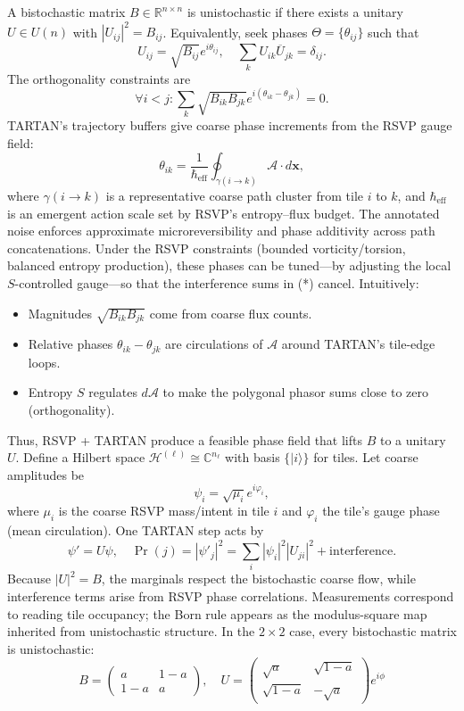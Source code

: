 \documentclass[11pt]{article}
\theoremstyle{plain}
\theoremstyle{definition}
\begin{document}
A bistochastic matrix $B \in \mathbb{R}^{n \times n}$ is unistochastic if there exists a unitary $U \in U(n)$ with $|U_{ij}|^2 = B_{ij}$. Equivalently, seek phases $\Theta = \{\theta_{ij}\}$ such that
\[
U_{ij} = \sqrt{B_{ij}} e^{i \theta_{ij}}, \quad \sum_k U_{ik} \overline{U}_{jk} = \delta_{ij}.
\]
The orthogonality constraints are
\[
\forall i < j: \sum_k \sqrt{B_{ik} B_{jk}} e^{i (\theta_{ik} - \theta_{jk})} = 0. \tag{*}
\]
TARTAN’s trajectory buffers give coarse phase increments from the RSVP gauge field:
\[
\theta_{ik} = \frac{1}{\hbar_{\mathrm{eff}}} \oint_{\gamma(i \to k)} \mathcal{A} \cdot d\bm{x},
\]
where $\gamma(i \to k)$ is a representative coarse path cluster from tile $i$ to $k$, and $\hbar_{\mathrm{eff}}$ is an emergent action scale set by RSVP’s entropy–flux budget. The annotated noise enforces approximate microreversibility and phase additivity across path concatenations. Under the RSVP constraints (bounded vorticity/torsion, balanced entropy production), these phases can be tuned—by adjusting the local $S$-controlled gauge—so that the interference sums in (*) cancel. Intuitively:
\begin{itemize}
    \item Magnitudes $\sqrt{B_{ik} B_{jk}}$ come from coarse flux counts.
    \item Relative phases $\theta_{ik} - \theta_{jk}$ are circulations of $\mathcal{A}$ around TARTAN’s tile-edge loops.
    \item Entropy $S$ regulates $d\mathcal{A}$ to make the polygonal phasor sums close to zero (orthogonality).
\end{itemize}
Thus, RSVP + TARTAN produce a feasible phase field that lifts $B$ to a unitary $U$.
Define a Hilbert space $\mathcal{H}^{(\ell)} \cong \mathbb{C}^{n_\ell}$ with basis $\{|i\rangle\}$ for tiles. Let coarse amplitudes be
\[
\psi_i = \sqrt{\mu_i} e^{i \varphi_i},
\]
where $\mu_i$ is the coarse RSVP mass/intent in tile $i$ and $\varphi_i$ the tile’s gauge phase (mean circulation). One TARTAN step acts by
\[
\psi' = U \psi, \quad \Pr(j) = |\psi'_j|^2 = \sum_i |\psi_i|^2 |U_{ji}|^2 + \text{interference}.
\]
Because $|U|^2 = B$, the marginals respect the bistochastic coarse flow, while interference terms arise from RSVP phase correlations. Measurements correspond to reading tile occupancy; the Born rule appears as the modulus-square map inherited from unistochastic structure.
In the $2 \times 2$ case, every bistochastic matrix is unistochastic:
\[
B = \begin{pmatrix} a & 1-a \\ 1-a & a \end{pmatrix}, \quad U = \begin{pmatrix} \sqrt{a} & \sqrt{1-a} \\ \sqrt{1-a} & -\sqrt{a} \end{pmatrix} e^{i\phi}
\]
\end{document}
